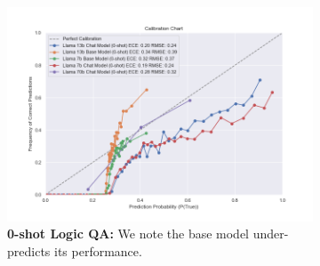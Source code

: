 \documentclass[11pt]{article}
\begin{document}

\begin{figure}
     \centering
     \begin{subfigure}[b]{0.60\textwidth}
         \centering \includegraphics[width=1.0\textwidth]{figures/0-shot-logic-qa.png}
         \caption{\textbf{0-shot Logic QA:} We note the base model under-predicts its performance.} 
         \label{fig:0-shot-MMLU}
     \end{subfigure}
     \hfill
     \begin{subfigure}[b]{0.38\textwidth}

\end{subfigure}
\end{figure}
\end{document}
